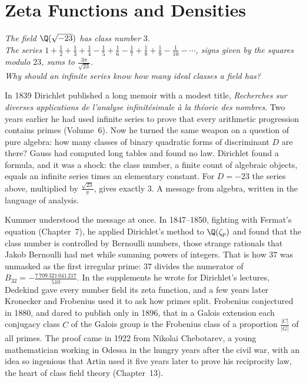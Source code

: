 \chapter{Zeta Functions and Densities}
\begin{center}\itshape
The field $\Q(\sqrt{-23})$ has class number $3$.\\
The series $1+\frac12+\frac13+\frac14-\frac15+\frac16-\frac17+\frac18+\frac19-\frac1{10}-\cdots$, signs given by the squares modulo $23$, sums to $\frac{3\pi}{\sqrt{23}}$.\\
Why should an infinite series know how many ideal classes a field has?
\end{center}

In 1839 Dirichlet published a long memoir with a modest title, \emph{Recherches sur diverses applications de l'analyse
infinit\'esimale \`a la th\'eorie des nombres}. Two years earlier he had used infinite series to prove that every arithmetic
progression contains primes (Volume~6). Now he turned the same weapon on a question of pure algebra: how many classes of
binary quadratic forms of discriminant $D$ are there? Gauss had computed long tables and found no law. Dirichlet found a
formula, and it was a shock: the class number, a finite count of algebraic objects, equals an infinite series times an
elementary constant. For $D=-23$ the series above, multiplied by $\frac{\sqrt{23}}\pi$, gives exactly $3$. A message from
algebra, written in the language of analysis.

Kummer understood the message at once. In 1847--1850, fighting with Fermat's equation (Chapter~7), he applied Dirichlet's
method to $\Q(\zeta_p)$ and found that the class number is controlled by Bernoulli numbers, those strange rationals that
Jakob Bernoulli had met while summing powers of integers. That is how $37$ was unmasked as the first irregular prime: $37$
divides the numerator of $B_{32}=-\frac{7\,709\,321\,041\,217}{510}$. In the supplements he wrote for Dirichlet's lectures, Dedekind gave every number field its zeta
function, and a few years later Kronecker and Frobenius used it to ask how primes split. Frobenius conjectured in 1880, and
dared to publish only in 1896, that in a Galois extension each conjugacy class $C$ of the Galois group is the Frobenius class
of a proportion $\frac{|C|}{|G|}$ of all primes. The proof came in 1922 from Nikolai Chebotarev, a young mathematician
working in Odessa in the hungry years after the civil war, with an idea so ingenious that Artin used it five years later to
prove his reciprocity law, the heart of class field theory (Chapter~13).

